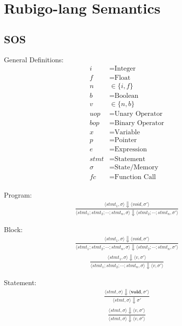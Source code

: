 \documentclass[12pt]{article}
\begin{document}
    \section{Rubigo-lang Semantics}
    \subsection{SOS}
	General Definitions:
    	\begin{align*}
		i &= \text{Integer} \\
		f &= \text{Float} \\
		n &\in \{i, f\} \\
		b &= \text{Boolean} \\
		v &\in \{n, b\} \\
		uop &= \text{Unary Operator} \\
		bop &= \text{Binary Operator} \\
		x &= \text{Variable} \\
		p &= \text{Pointer} \\
		e &= \text{Expression} \\
		stmt &= \text{Statement} \\
		\sigma &= \text{State/Memory} \\
		fc &= \text{Function Call} \\
	\end{align*}

	Program:
	\begin{align*}
		\frac{\langle stmt_1, \sigma \rangle\Downarrow \langle void, \sigma' \rangle}
		{\langle stmt_1;stmt_2;\cdots;stmt_n, \sigma \rangle\Downarrow \langle stmt_2;\cdots;stmt_n, \sigma' \rangle}
	\end{align*}

	Block:
	\begin{align*}
		\frac{\langle stmt_1, \sigma \rangle\Downarrow \langle void, \sigma' \rangle}
		{\langle stmt_1;stmt_2;\cdots;stmt_n, \sigma \rangle\Downarrow \langle stmt_2;\cdots;stmt_n, \sigma' \rangle}
	\end{align*}
	\begin{align*}
		\frac{\langle stmt_1, \sigma \rangle\Downarrow \langle v, \sigma' \rangle}
		{\langle stmt_1;stmt_2;\cdots;stmt_n, \sigma \rangle\Downarrow \langle v, \sigma' \rangle}
	\end{align*}

	Statement:
	\begin{align*}
		\frac{\langle stmt, \sigma \rangle\Downarrow \langle \textbf{void}, \sigma' \rangle}
		{\langle stmt, \sigma \rangle\Downarrow \sigma'}
	\end{align*}
	\begin{align*}
		\frac{\langle stmt, \sigma \rangle\Downarrow \langle v, \sigma' \rangle}
		{\langle stmt, \sigma \rangle\Downarrow \langle v, \sigma' \rangle}
	\end{align*}
\end{document}
